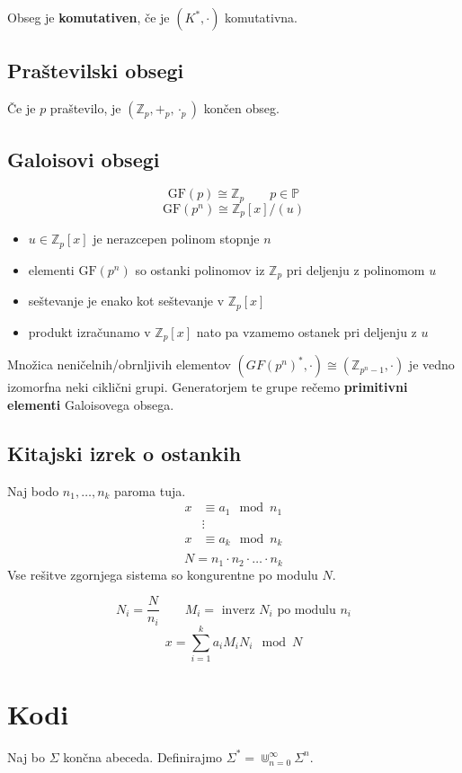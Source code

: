 \begin{multicols}{5}
Obseg je \textbf{komutativen}, če je $(K^*, \cdot)$ komutativna.

\subsection*{Praštevilski obsegi}
Če je $p$ praštevilo, je $(\mathbb{Z}_p, +_p, \cdot_p)$ končen obseg.


\subsection*{Galoisovi obsegi}
\[\text{GF}(p) \cong \mathbb{Z}_p \qquad p \in \mathbb{P}\]
\[ \text{GF}(p^n) \cong \mathbb{Z}_p[x]/(u) \]
\begin{itemize}
	\item $u \in \mathbb{Z}_p[x]$ je nerazcepen polinom stopnje $n$
	\item elementi $\text{GF}(p^n)$ so ostanki polinomov iz $\mathbb{Z}_p$ pri deljenju z polinomom $u$
	\item seštevanje je enako kot seštevanje v $\mathbb{Z}_p[x]$
	\item produkt izračunamo v $\mathbb{Z}_p[x]$ nato pa vzamemo ostanek pri deljenju z $u$
\end{itemize}

Množica neničelnih/obrnljivih elementov $(GF(p^n)^*, \cdot) \cong (\mathbb{Z}_{p^n-1}, \cdot)$ je vedno izomorfna neki ciklični grupi.
Generatorjem te grupe rečemo \textbf{primitivni elementi} Galoisovega obsega.

\subsection*{Kitajski izrek o ostankih}
Naj bodo $n_1, \dots, n_k$ paroma tuja.
\begin{align*}
	x &\equiv a_1 \mod n_1 \\
	 & \vdots \\
	x &\equiv a_k \mod n_k \\
\end{align*}
\[ N = n_1 \cdot n_2 \cdot \dots \cdot n_k \]
Vse rešitve zgornjega sistema so kongurentne po modulu $N$.

\[ N_i = \frac{N}{n_i} \qquad M_i = \text{ inverz } N_i \text{ po modulu } n_i\]
\[x = \sum_{i=1}^{k} a_i M_i N_i \mod N\]



\newpage
\section*{Kodi}
Naj bo $\Sigma$ končna abeceda. Definirajmo $\Sigma^* = \Cup_{n=0}^\infty \Sigma^n$.


\end{multicols}
